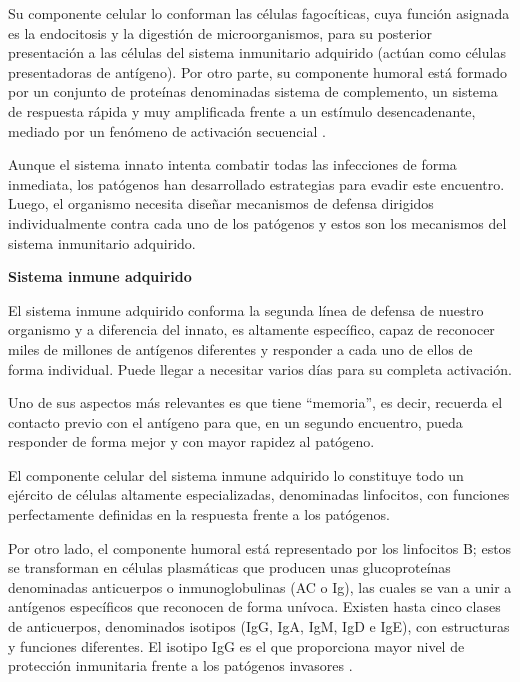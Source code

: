 Su componente celular lo conforman las células fagocíticas, cuya función asignada es la endocitosis y la digestión de microorganismos, para su posterior presentación a las células del sistema inmunitario adquirido (actúan como células presentadoras de antígeno). Por otro parte, su componente humoral está formado por un conjunto de proteínas denominadas sistema de complemento, un sistema de respuesta rápida y muy amplificada frente a un estímulo desencadenante, mediado por un fenómeno de activación secuencial \cite{aep2026}.

Aunque el sistema innato intenta combatir todas las infecciones de forma inmediata, los patógenos han desarrollado estrategias para evadir este encuentro. Luego, el organismo necesita diseñar mecanismos de defensa dirigidos individualmente contra cada uno de los patógenos y estos son los mecanismos del sistema inmunitario adquirido.

\vspace{\baselineskip}
\textbf{Sistema inmune adquirido}
\vspace{\baselineskip}

El sistema inmune adquirido conforma la segunda línea de defensa de nuestro organismo y a diferencia del innato, es altamente específico, capaz de reconocer miles de millones de antígenos diferentes y responder a cada uno de ellos de forma individual. Puede llegar a necesitar varios días para su completa activación.

Uno de sus aspectos más relevantes es que tiene “memoria”, es decir, recuerda el contacto previo con el antígeno para que, en un segundo encuentro, pueda responder de forma mejor y con mayor rapidez al patógeno.

El componente celular del sistema inmune adquirido lo constituye todo un ejército de células altamente especializadas, denominadas linfocitos, con funciones perfectamente definidas en la respuesta frente a los patógenos.

Por otro lado, el componente humoral está representado por los linfocitos B; estos se transforman en células plasmáticas que producen unas glucoproteínas denominadas anticuerpos o inmunoglobulinas (AC o Ig), las cuales se van a unir a antígenos específicos que reconocen de forma unívoca. Existen hasta cinco clases de anticuerpos, denominados isotipos (IgG, IgA, IgM, IgD e IgE), con estructuras y funciones diferentes. El isotipo IgG es el que proporciona mayor nivel de protección inmunitaria frente a los patógenos invasores \cite{aep2026}.

